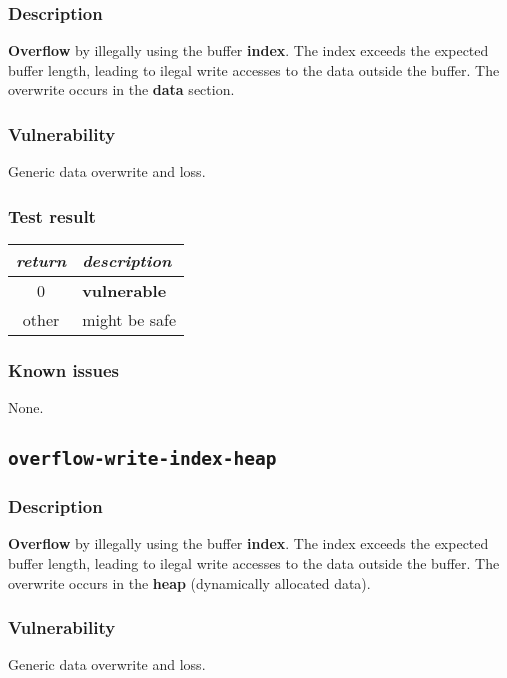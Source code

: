 \documentclass[a4paper]{book}
\begin{document}
\subsubsection{Description}

\textbf{Overflow} by illegally using the buffer \textbf{index}.
The index exceeds the expected buffer length,
leading to ilegal write accesses to the data outside the buffer.
The overwrite occurs in the \textbf{data} section.

\subsubsection{Vulnerability}
Generic data overwrite and loss.

\subsubsection{Test result}

\begin{tabular}{cl}
  \toprule
  \emph{return}  & \emph{description} \\
  \midrule
  0              & \textbf{vulnerable} \\
  other          & might be safe \\
  \bottomrule
\end{tabular}

\subsubsection{Known issues}

None.

\newpage

\subsection{\texttt{overflow-write-index-heap}}\label{test-overflow-write-index-heap}

\subsubsection{Description}

\textbf{Overflow} by illegally using the buffer \textbf{index}.
The index exceeds the expected buffer length,
leading to ilegal write accesses to the data outside the buffer.
The overwrite occurs in the \textbf{heap} (dynamically allocated data).

\subsubsection{Vulnerability}
Generic data overwrite and loss.
\end{document}

